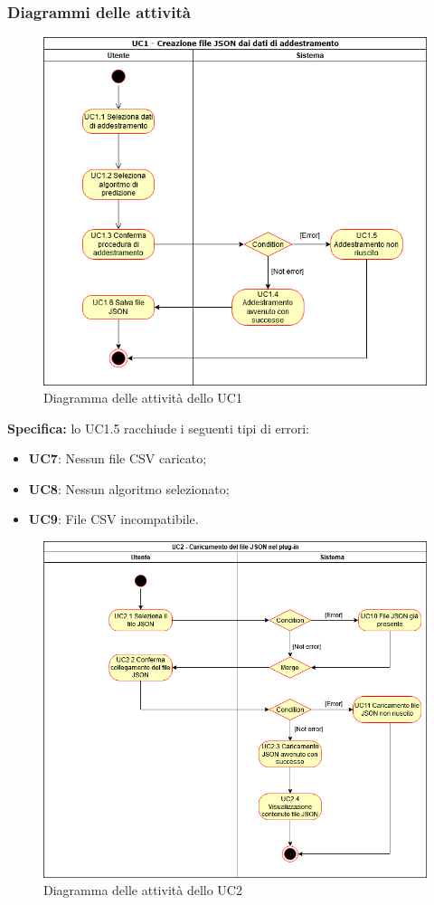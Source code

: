 \subsubsection{Diagrammi delle attività}
\begin{figure}[H]
\centering
\includegraphics[scale=0.6]{../../Diagrams/Activity_diagrams/uc1.png}
\caption{Diagramma delle attività dello UC1}
\end{figure}
\textbf{Specifica:} lo UC1.5 racchiude i seguenti tipi di errori: 
\begin{itemize}
	\item \textbf{UC7}: Nessun file CSV caricato;
	\item \textbf{UC8}: Nessun algoritmo selezionato;
	\item \textbf{UC9}: File CSV incompatibile.
\end{itemize}
\begin{figure}[H]
\centering
\includegraphics[scale=0.6]{../../Diagrams/Activity_diagrams/uc2.png}
\caption{Diagramma delle attività dello UC2}
\end{figure}
